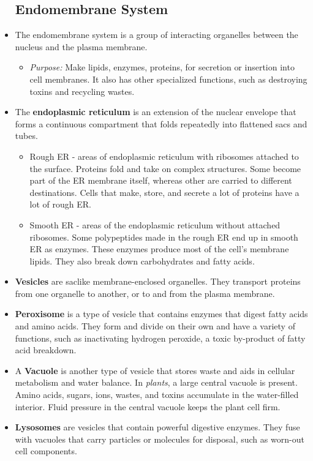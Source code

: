 \documentclass[letterpaper]{article}
\numberwithin{equation}{section}
\theoremstyle{classic}
\begin{document}
\begin{itemize}
    \subsection{Endomembrane System}
    \item The endomembrane system is a group of interacting organelles between the nucleus and the plasma membrane.
    \begin{itemize}
        \item \textit{Purpose: } Make lipids, enzymes, proteins, for secretion or insertion into cell membranes. It also has other specialized functions, such as destroying toxins and recycling wastes.
    \end{itemize}
    \item The \textbf{endoplasmic reticulum} is an extension of the nuclear envelope that forms a continuous compartment that folds repeatedly into flattened sacs and tubes.
    \begin{itemize}
        \item Rough ER - areas of endoplasmic reticulum with ribosomes attached to the surface. Proteins fold and take on complex structures. Some become part of the ER membrane itself, whereas other are carried to different destinations. Cells that make, store, and secrete a lot of proteins have a lot of rough ER.
        \item Smooth ER - areas of the endoplasmic reticulum without attached ribosomes. Some polypeptides made in the rough ER end up in smooth ER as enzymes. These enzymes produce most of the cell’s membrane lipids. They also break down carbohydrates and fatty acids.
    \end{itemize}
    \item \textbf{Vesicles} are saclike membrane-enclosed organelles. They transport proteins from one organelle to another, or to and from the plasma membrane.
    \item \textbf{Peroxisome} is a type of vesicle that contains enzymes that digest fatty acids and amino acids. They form and divide on their own and have a variety of functions, such as inactivating hydrogen peroxide, a toxic by-product of fatty acid breakdown.
    \item A \textbf{Vacuole} is another type of vesicle that stores waste and aids in cellular metabolism and water balance. In \textit{plants}, a large central vacuole is present. Amino acids, sugars, ions, wastes, and toxins accumulate in the water-filled interior. Fluid pressure in the central vacuole keeps the plant cell firm.
    \item \textbf{Lysosomes} are vesicles that contain powerful digestive enzymes. They fuse with vacuoles that carry particles or molecules for disposal, such as worn-out cell components.

\end{itemize}
\end{document}
